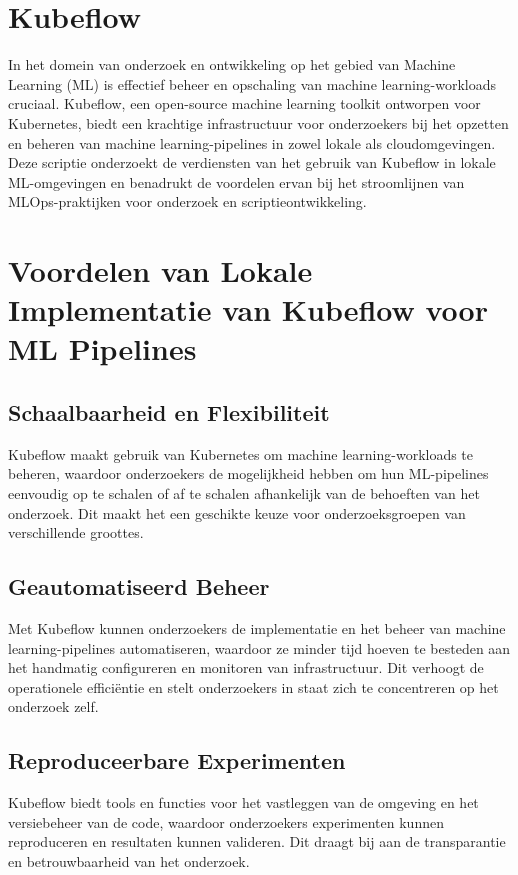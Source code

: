 \section{Kubeflow}

In het domein van onderzoek en ontwikkeling op het gebied van Machine Learning (ML) is effectief beheer en opschaling van machine learning-workloads cruciaal. Kubeflow, een open-source machine learning toolkit ontworpen voor Kubernetes, biedt een krachtige infrastructuur voor onderzoekers bij het opzetten en beheren van machine learning-pipelines in zowel lokale als cloudomgevingen. Deze scriptie onderzoekt de verdiensten van het gebruik van Kubeflow in lokale ML-omgevingen en benadrukt de voordelen ervan bij het stroomlijnen van MLOps-praktijken voor onderzoek en scriptieontwikkeling.

\section{Voordelen van Lokale Implementatie van Kubeflow voor ML Pipelines}

\subsection{Schaalbaarheid en Flexibiliteit}
Kubeflow maakt gebruik van Kubernetes om machine learning-workloads te beheren, waardoor onderzoekers de mogelijkheid hebben om hun ML-pipelines eenvoudig op te schalen of af te schalen afhankelijk van de behoeften van het onderzoek. Dit maakt het een geschikte keuze voor onderzoeksgroepen van verschillende groottes.

\subsection{Geautomatiseerd Beheer}
Met Kubeflow kunnen onderzoekers de implementatie en het beheer van machine learning-pipelines automatiseren, waardoor ze minder tijd hoeven te besteden aan het handmatig configureren en monitoren van infrastructuur. Dit verhoogt de operationele efficiëntie en stelt onderzoekers in staat zich te concentreren op het onderzoek zelf.

\subsection{Reproduceerbare Experimenten}
Kubeflow biedt tools en functies voor het vastleggen van de omgeving en het versiebeheer van de code, waardoor onderzoekers experimenten kunnen reproduceren en resultaten kunnen valideren. Dit draagt bij aan de transparantie en betrouwbaarheid van het onderzoek.

